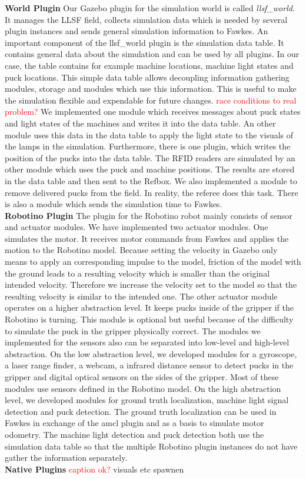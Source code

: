 \textbf{World Plugin}
Our Gazebo plugin for the simulation world is called \textit{llsf\_world}. It manages the LLSF field, collects simulation data which is needed by several plugin instances and sends general simulation information to Fawkes. An important component of the llsf\_world plugin is the simulation data table. It contains general data about the simulation and can be used by all plugins. In our case, the table contains for example machine locations, machine light states and puck locations. This simple data table allows decoupling information gathering modules, storage and modules which use this information. This is useful to make the simulation flexible and expendable for future changes. \textcolor{red}{race conditions to real problem?} We implemented one module which receives messages about puck states and light states of the machines and writes it into the data table. An other module uses this data in the data table to apply the light state to the visuals of the lamps in the simulation. Furthermore, there is one plugin, which writes the position of the pucks into the data table. The RFID readers are simulated by an other module which uses the puck and machine positions. The results are stored in the data table and then sent to the Refbox. We also implemented a module to remove delivered pucks from the field. In reality, the referee does this task. There is also a module which sends the simulation time to Fawkes.
\\
\textbf{Robotino Plugin}
The plugin for the Robotino robot mainly consists of sensor and actuator modules. We have implemented two actuator modules. One simulates the motor. It receives motor commands from Fawkes and applies the motion to the Robotino model. Because setting the velocity in Gazebo only means to apply an corresponding impulse to the model, friction of the model with the ground leads to a resulting velocity which is smaller than the original intended velocity. Therefore we increase the velocity set to the model so that the resulting velocity is similar to the intended one. The other actuator module operates on a higher abstraction level. It keeps pucks inside of the gripper if the Robotino is turning. This module is optional but useful because of the difficulty to simulate the puck in the gripper physically correct. The modules we implemented for the sensors also can be separated into low-level and high-level abstraction. On the low abstraction level, we developed modules for a gyroscope, a laser range finder, a webcam, a infrared distance sensor to detect pucks in the gripper and digital optical sensors on the sides of the gripper. Most of these modules use sensors defined in the Robotino model. On the high abstraction level, we developed modules for ground truth localization, machine light signal detection and puck detection. The ground truth localization can be used in Fawkes in exchange of the amcl plugin and as a basis to simulate motor odometry. The machine light detection and puck detection both use the simulation data table so that the multiple Robotino plugin instances do not have gather the information separately.
\\
\textbf{Native Plugins}
\textcolor{red}{caption ok?}
visuals etc spawnen


